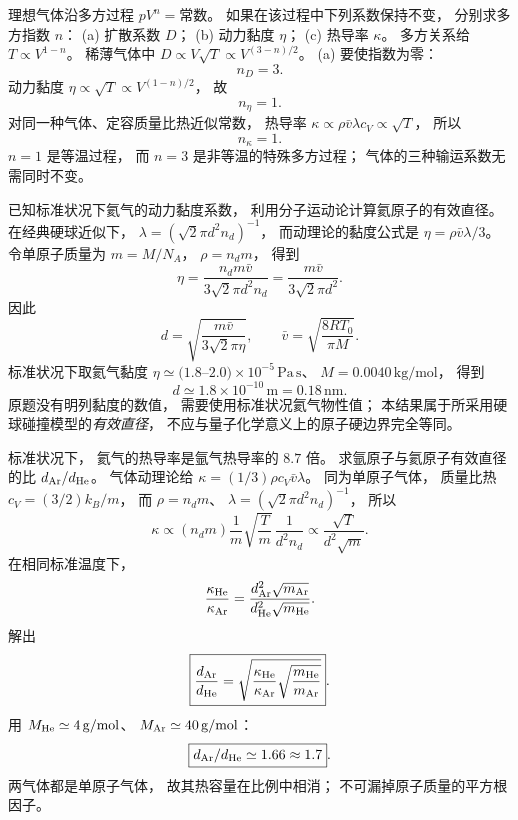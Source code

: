 理想气体沿多方过程
$pV^n=\text{常数}$。
如果在该过程中下列系数保持不变，
分别求多方指数 $n$：
(a) 扩散系数 $D$；
(b) 动力黏度 $\eta$；
(c) 热导率 $\kappa$。
\exsolution
多方关系给
$T\propto V^{1-n}$。
稀薄气体中
$D\propto V\sqrt T
\propto V^{(3-n)/2}$。
(a) 要使指数为零：
\[
\boxed{n_D=3}.
\]
动力黏度
$\eta\propto\sqrt T
\propto V^{(1-n)/2}$，
故
\[
\boxed{n_\eta=1}.
\]
对同一种气体、定容质量比热近似常数，
热导率
$\kappa\propto\rho\bar v\lambda c_V
\propto\sqrt T$，
所以
\[
\boxed{n_\kappa=1}.
\]
\excheck $n=1$ 是等温过程，
而 $n=3$ 是非等温的特殊多方过程；
气体的三种输运系数无需同时不变。

已知标准状况下氦气的动力黏度系数，
利用分子运动论计算氦原子的有效直径。
\exsolution
在经典硬球近似下，
$\lambda=(\sqrt2\pi d^2n_d)^{-1}$，
而动理论的黏度公式是
$\eta=\rho\bar v\lambda/3$。
令单原子质量为
$m=M/N_A$，
$\rho=n_dm$，
得到
\[
\eta=\frac{n_dm\bar v}
{3\sqrt2\pi d^2 n_d}
=\frac{m\bar v}{3\sqrt2\pi d^2}.
\]
因此
\[
\boxed{d=\sqrt{
\frac{m\bar v}{3\sqrt2\pi\eta}
}},\qquad
\bar v=\sqrt{\frac{8RT_0}{\pi M}}.
\]
标准状况下取氦气黏度
$\eta\simeq(1.8$--$2.0)\times10^{-5}\,
\mathrm{Pa\,s}$、
$M=0.0040\,\mathrm{kg/mol}$，
得到
\[
\boxed{d\simeq1.8\times10^{-10}\,\mathrm m
=0.18\,\mathrm{nm}}.
\]
\excheck 原题没有明列黏度的数值，
需要使用标准状况氦气物性值；
本结果属于所采用硬球碰撞模型的\emph{有效直径}，
不应与量子化学意义上的原子硬边界完全等同。

标准状况下，
氦气的热导率是氩气热导率的
$8.7$ 倍。
求氩原子与氦原子有效直径的比
$d_{\rm Ar}/d_{\rm He}$。
\exsolution
气体动理论给
$\kappa=(1/3)\rho c_V\bar v\lambda$。
同为单原子气体，
质量比热
$c_V=(3/2)k_B/m$，
而
$\rho=n_dm$、
$\lambda=(\sqrt2\pi d^2n_d)^{-1}$，
所以
\[
\kappa\propto
(n_dm)\frac1m
\sqrt{\frac{T}{m}}\,
\frac1{d^2n_d}
\propto\frac{\sqrt T}{d^2\sqrt m}.
\]
在相同标准温度下，
\[
\frac{\kappa_{\rm He}}{\kappa_{\rm Ar}}
=\frac{d_{\rm Ar}^2\sqrt{m_{\rm Ar}}}
{d_{\rm He}^2\sqrt{m_{\rm He}}}.
\]
解出
\[
\boxed{\frac{d_{\rm Ar}}{d_{\rm He}}
=\sqrt{
\frac{\kappa_{\rm He}}{\kappa_{\rm Ar}}
\sqrt{\frac{m_{\rm He}}{m_{\rm Ar}}}}}.
\]
用 $M_{\rm He}\simeq4\,\mathrm{g/mol}$、
$M_{\rm Ar}\simeq40\,\mathrm{g/mol}$：
\[
\boxed{d_{\rm Ar}/d_{\rm He}\simeq1.66
\approx1.7}.
\]
\excheck 两气体都是单原子气体，
故其热容量在比例中相消；
不可漏掉原子质量的平方根因子。

